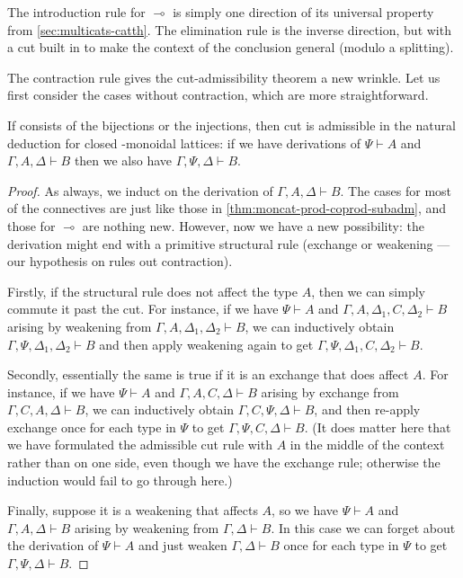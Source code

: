 \documentclass{book}
\let\types\vdash
\let\hom\multimap
\begin{document}
The introduction rule for $\hom$ is simply one direction of its universal property from \cref{sec:multicats-catth}.
The elimination rule is the inverse direction, but with a cut built in to make the context of the conclusion general (modulo a splitting).

The contraction rule gives the cut-admissibility theorem a new wrinkle.
Let us first consider the cases without contraction, which are more straightforward.

\begin{lem}\label{thm:natded-logic-cutadm}
  If \fS consists of the bijections or the injections, then cut is admissible in the natural deduction for closed \fS-monoidal lattices: if we have derivations of $\Psi\types A$ and $\Gamma,A,\Delta\types B$ then we also have $\Gamma,\Psi,\Delta\types B$.
\end{lem}
\begin{proof}
  As always, we induct on the derivation of $\Gamma,A,\Delta\types B$.
  The cases for most of the connectives are just like those in \cref{thm:moncat-prod-coprod-subadm}, and those for $\hom$ are nothing new.
  However, now we have a new possibility: the derivation might end with a primitive structural rule (exchange or weakening --- our hypothesis on \fS rules out contraction).

  Firstly, if the structural rule does not affect the type $A$, then we can simply commute it past the cut.
  For instance, if we have $\Psi\types A$ and $\Gamma,A,\Delta_1,C,\Delta_2\types B$ arising by weakening from $\Gamma,A,\Delta_1,\Delta_2\types B$, we can inductively obtain $\Gamma,\Psi,\Delta_1,\Delta_2\types B$ and then apply weakening again to get $\Gamma,\Psi,\Delta_1,C,\Delta_2\types B$.

  Secondly, essentially the same is true if it is an exchange that does affect $A$.
  For instance, if we have $\Psi\types A$ and $\Gamma,A,C,\Delta\types B$ arising by exchange from $\Gamma,C,A,\Delta\types B$, we can inductively obtain $\Gamma,C,\Psi,\Delta\types B$, and then re-apply exchange once for each type in $\Psi$ to get $\Gamma,\Psi,C,\Delta\types B$.
  (It does matter here that we have formulated the admissible cut rule {with} $A$ in the middle of the context rather than on one side, even though we have the exchange rule; otherwise the induction would fail to go through here.)

  Finally, suppose it is a weakening that affects $A$, so we have $\Psi\types A$ and $\Gamma,A,\Delta\types B$ arising by weakening from $\Gamma,\Delta\types B$.
  In this case we can forget about the derivation of $\Psi\types A$ and just weaken $\Gamma,\Delta\types B$ once for each type in $\Psi$ to get $\Gamma,\Psi,\Delta\types B$.
\end{proof}
\end{document}
